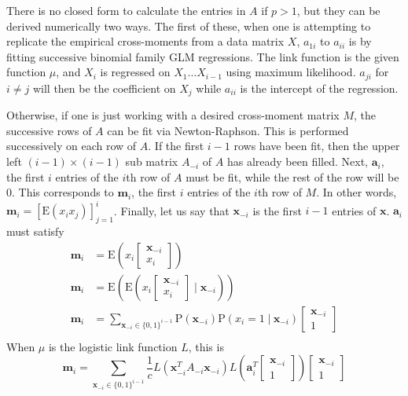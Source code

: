 \documentclass[11pt]{article}
\newcommand{\p}{\mathrm{P}}
\newcommand{\E}{\mathrm{E}}
\newcommand{\st}{ \; \big | \:}
\theoremstyle{definition}
\begin{document}
    There is no closed form to calculate the entries in $A$ if $p>1$, but they can be derived numerically two ways. The first of these, when one is attempting to replicate the empirical cross-moments from a data matrix $X$, $a_{1i}$ to $a_{ii}$ is by fitting successive binomial family GLM regressions. The link function is the given function $\mu$, and $X_i$ is regressed on $X_{1} \ldots X_{i-1}$ using maximum likelihood. $a_{ji}$ for $i\neq j$ will then be the coefficient on $X_j$ while $a_{ii}$ is the intercept of the regression. \par
    Otherwise, if one is just working with a desired cross-moment matrix $M$, the successive rows of $A$ can be fit via Newton-Raphson. This is performed successively on each row of $A$. If the first $i-1$ rows have been fit, then the upper left $(i-1)\times(i-1)$ sub matrix $A_{-i}$ of $A$ has already been filled. Next, $\mathbf a_i$, the first $i$ entries of the $i$th row of $A$ must be fit, while the rest of the row will be 0. This corresponds to $\mathbf m_i$, the first $i$ entries of the $i$th row of $M$. In other words, $\mathbf{m}_i = [\E(x_i x_j)]_{j=1}^{i}$. Finally, let us say that $\mathbf x_{-i}$ is the first $i-1$ entries of $\mathbf x$. $\mathbf a_i$ must satisfy 
            \begin{align*}
                \mathbf m_i &= \E\left(x_i \left[\begin{array}{c} \mathbf x_{-i} \\ x_i \end{array}\right]\right) \\
                \mathbf m_i &= \E\left(\E\left(x_i \left[\begin{array}{c} \mathbf x_{-i} \\ x_i \end{array}\right]\;\bigg \vert\; \mathbf x_{-i}\right)\right)\\
                \mathbf m_i &= \sum_{\mathbf x_{-i} \in \{0,1\}^{i-1}} \p(\mathbf x_{-i})\p(x_i=1\st \mathbf x_{-i}) \left[\begin{array}{c} \mathbf x_{-i} \\ 1 \end{array}\right] \\
            \end{align*}
            When $\mu$ is the logistic link function $L$, this is
            \[ \mathbf m_i = \sum_{\mathbf x_{-i} \in \{0,1\}^{i-1}} \frac{1}{c}L\left(\mathbf x_{-i}^TA_{-i}\mathbf x_{-i}\right) L\left(\mathbf{a}_i^T\left[\begin{array}{c} \mathbf x_{-i} \\ 1 \end{array}\right]\right)\left[\begin{array}{c} \mathbf x_{-i} \\ 1 \end{array}\right] \]
\end{document}
